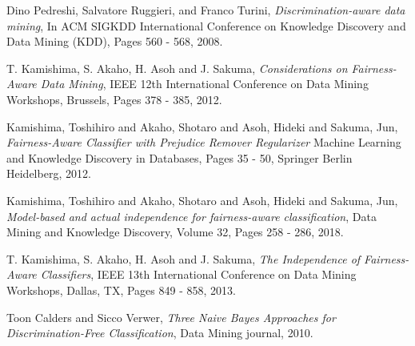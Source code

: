 \documentclass[a4paper, 12pt, notitlepage]{article}
\begin{document}
\begin{thebibliography}{10}

  
  
  Dino Pedreshi, Salvatore Ruggieri, and Franco Turini,
  \textit{Discrimination-aware data mining},
  In ACM SIGKDD International Conference on Knowledge Discovery and Data Mining (KDD),
  Pages 560 - 568, 
  2008.

  T. Kamishima, S. Akaho, H. Asoh and J. Sakuma,
  \textit{Considerations on Fairness-Aware Data Mining},
  IEEE 12th International Conference on Data Mining Workshops, Brussels,
  Pages 378 - 385,
  2012.

  Kamishima, Toshihiro and Akaho, Shotaro and Asoh, Hideki and Sakuma, Jun,
  \textit{Fairness-Aware Classifier with Prejudice Remover Regularizer}
  Machine Learning and Knowledge Discovery in Databases,
  Pages 35 - 50,
  Springer Berlin Heidelberg,
  2012.

  Kamishima, Toshihiro and Akaho, Shotaro and Asoh, Hideki and Sakuma, Jun,
  \textit{Model-based and actual independence for fairness-aware classification},
  Data Mining and Knowledge Discovery,
  Volume 32,
  Pages 258 - 286,
  2018.

  T. Kamishima, S. Akaho, H. Asoh and J. Sakuma, 
  \textit{The Independence of Fairness-Aware Classifiers},
  IEEE 13th International Conference on Data Mining Workshops, Dallas, TX,
  Pages 849 - 858,
  2013.


  Toon Calders and Sicco Verwer,
  \textit{Three Naive Bayes Approaches for Discrimination-Free Classification},
  Data Mining journal,
  2010. 

\end{thebibliography}
\end{document}
